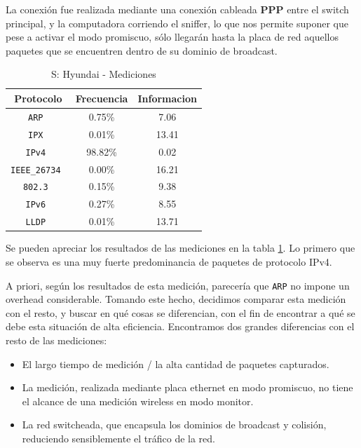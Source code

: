 \documentclass[final,inline,a4paper,narroweqnarray]{ieee}
\begin{document}
    La conexión fue realizada mediante una conexión cableada
    \textbf{PPP} entre el switch principal, y la computadora corriendo
    el sniffer, lo que nos permite suponer que pese a activar el modo
    promiscuo, sólo llegarán hasta la placa de red aquellos paquetes
    que se encuentren dentro de su dominio de broadcast.

    \begin{table}\begin{center}
      \begin{tabular}{|c|c|c|}
      \hline
      \textbf{Protocolo}   & \textbf{Frecuencia} & \textbf{Informacion}\\ \hline
      \texttt{ARP         }& 0.75\%     & 7.06       \\ \hline
      \texttt{IPX         }& 0.01\%     & 13.41      \\ \hline
      \texttt{IPv4        }& 98.82\%    & 0.02       \\ \hline
      \texttt{IEEE\_26734 }& 0.00\%     & 16.21      \\ \hline
      \texttt{802.3       }& 0.15\%     & 9.38       \\ \hline
      \texttt{IPv6        }& 0.27\%     & 8.55       \\ \hline
      \texttt{LLDP        }& 0.01\%     & 13.71      \\ \hline
      \end{tabular}
      \caption{S: Hyundai - Mediciones}
      \label{hyundai-s-table}
    \end{center}\end{table}

    Se pueden apreciar los resultados de las mediciones en la tabla
    \ref{hyundai-s-table}. Lo primero que se observa es una muy fuerte
    predominancia de paquetes de protocolo IPv4.

    A priori, según los resultados de esta medición, parecería que
    \texttt{ARP} no impone un overhead considerable. Tomando este
    hecho, decidimos comparar esta medición con el resto, y buscar en
    qué cosas se diferencian, con el fin de encontrar a qué se debe
    esta situación de alta eficiencia. Encontramos dos grandes
    diferencias con el resto de las mediciones:

    \begin{itemize}

    \item El largo tiempo de medición / la alta cantidad de paquetes
    capturados.

    \item La medición, realizada mediante placa ethernet en modo
    promiscuo, no tiene el alcance de una medición wireless en modo
    monitor.

    \item La red switcheada, que encapsula los dominios de broadcast y
    colisión, reduciendo sensiblemente el tráfico de la red.

    \end{itemize}
\end{document}
